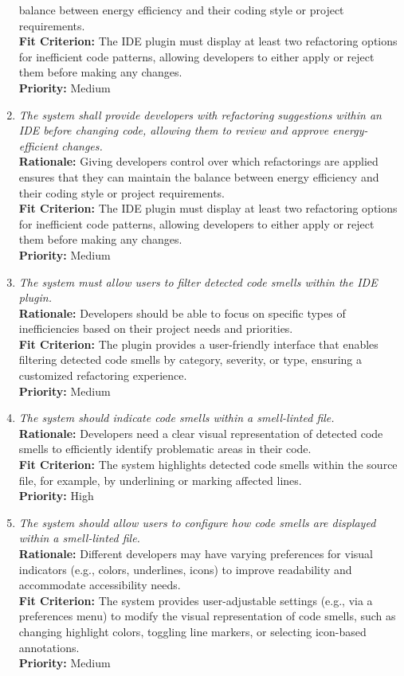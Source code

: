 \documentclass[12pt]{article}
\begin{document}
\begin{enumerate}[label=FR \arabic*., wide=0pt, leftmargin=*]
    balance between energy efficiency and their coding style or
    project requirements.\\
    {\bf Fit Criterion:} The IDE plugin must display at least two
    refactoring options for inefficient code patterns, allowing
    developers to either apply or reject them before making any changes.\\
    {\bf Priority:} Medium
  \item \emph{The system shall provide developers with refactoring
      suggestions within an IDE before changing code, allowing them
    to review and approve energy-efficient changes.}\\[2mm]
    {\bf Rationale:} Giving developers control over which
    refactorings are applied ensures that they can maintain the
    balance between energy efficiency and their coding style or
    project requirements.\\
    {\bf Fit Criterion:} The IDE plugin must display at least two
    refactoring options for inefficient code patterns, allowing
    developers to either apply or reject them before making any changes.\\
    {\bf Priority:} Medium
  \item \emph{The system must allow users to filter detected code smells within the IDE plugin.}\\[2mm]
    {\bf Rationale:} Developers should be able to focus on specific types of inefficiencies based on their 
    project needs and priorities.\\
    {\bf Fit Criterion:} The plugin provides a user-friendly interface that enables filtering detected code 
    smells by category, severity, or type, ensuring a customized refactoring experience.\\
    {\bf Priority:} Medium
  \item \emph{The system should indicate code smells within a smell-linted file.}\\[2mm]
    {\bf Rationale:} Developers need a clear visual representation of detected code smells to efficiently identify problematic areas in their code.\\
    {\bf Fit Criterion:} The system highlights detected code smells within the source file, for example, by underlining or marking affected lines.\\
    {\bf Priority:} High
  
  \item \emph{The system should allow users to configure how code smells are displayed within a smell-linted file.}\\[2mm]  
    {\bf Rationale:} Different developers may have varying preferences for visual indicators (e.g., colors, underlines, icons) to improve readability and accommodate accessibility needs.\\  
    {\bf Fit Criterion:} The system provides user-adjustable settings (e.g., via a preferences menu) to modify the visual representation of code smells, such as changing highlight colors, toggling line markers, or selecting icon-based annotations.\\  
    {\bf Priority:} Medium  


\end{enumerate}
\end{document}
